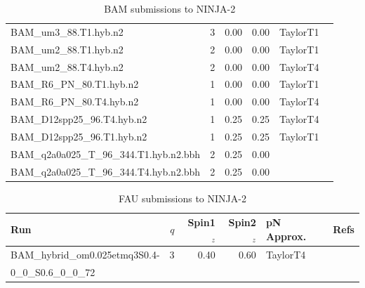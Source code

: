 \begin{table}
\begin{center}
\begin{tabular}{|l|r|r|r|l|c|}
BAM\_um3\_88.T1.hyb.n2 & 3 & 0.00 & 0.00 & TaylorT1 & \cite{Hannam:2007wf,Brugmann:2008zz} \\
BAM\_um2\_88.T1.hyb.n2 & 2 & 0.00 & 0.00 & TaylorT1 & \cite{Hannam:2007wf,Brugmann:2008zz} \\
BAM\_um2\_88.T4.hyb.n2 & 2 & 0.00 & 0.00 & TaylorT4 & \cite{Hannam:2007wf,Brugmann:2008zz} \\
BAM\_R6\_PN\_80.T1.hyb.n2 & 1 & 0.00 & 0.00 & TaylorT1 & \cite{Hannam:2007wf,Brugmann:2008zz} \\
BAM\_R6\_PN\_80.T4.hyb.n2 & 1 & 0.00 & 0.00 & TaylorT4 & \cite{Hannam:2007wf,Brugmann:2008zz} \\
BAM\_D12spp25\_96.T4.hyb.n2 & 1 & 0.25 & 0.25 & TaylorT4 & \cite{Hannam:2007wf,Brugmann:2008zz} \\
BAM\_D12spp25\_96.T1.hyb.n2 & 1 & 0.25 & 0.25 & TaylorT1 & \cite{Hannam:2007wf,Brugmann:2008zz} \\
BAM\_q2a0a025\_T\_96\_344.T1.hyb.n2.bbh & 2 & 0.25 & 0.00 & {} & \cite{Brugmann:2008zz} \\
BAM\_q2a0a025\_T\_96\_344.T4.hyb.n2.bbh & 2 & 0.25 & 0.00 & {} & \cite{Brugmann:2008zz} \\
\hline
\end{tabular}
\end{center}
\caption[BAM submissions to NINJA-2]{
\label{tab:ninja2_bam}
BAM submissions to NINJA-2}
\end{table}

\begin{table}
\begin{center}
\begin{tabular}{|l|r|r|r|l|c|}
\hline
Run & $q$ & Spin1${}_z$ & Spin2${}_z$ & pN Approx. & Refs \\
\hline
BAM\_hybrid\_om0.025etmq3S0.4- & 3 & 0.40 & 0.60 & TaylorT4 &
\cite{Bruegmann:2003aw,Marronetti:2007wz} \\
0\_0\_S0.6\_0\_0\_72 &  &  &  &  &  \\
\hline
\end{tabular}
\end{center}
\caption[FAU submissions to NINJA-2]{
\label{tab:ninja2_fau}
FAU submissions to NINJA-2}
\end{table}

